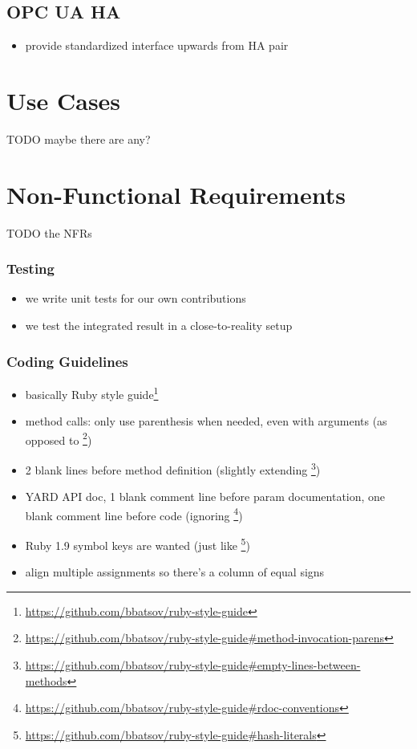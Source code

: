 \subsection{OPC UA HA}
\begin{itemize}
	\item provide standardized interface upwards from HA pair
\end{itemize}

\section{Use Cases}
TODO maybe there are any?

\section{Non-Functional Requirements}
TODO the NFRs

\subsubsection{Testing}
\begin{itemize}
	\item we write unit tests for our own contributions
	\item we test the integrated result in a close-to-reality setup
\end{itemize}


\subsubsection{Coding Guidelines}
\begin{itemize}
	\item basically Ruby style guide\footnote{\url{https://github.com/bbatsov/ruby-style-guide}}
	\item method calls: only use parenthesis when needed, even with arguments (as opposed to \footnote{\url{https://github.com/bbatsov/ruby-style-guide\#method-invocation-parens}})
	\item 2 blank lines before method definition (slightly extending \footnote{\url{https://github.com/bbatsov/ruby-style-guide\#empty-lines-between-methods}})
	\item YARD API doc, 1 blank comment line before param documentation, one blank comment line before code (ignoring \footnote{\url{https://github.com/bbatsov/ruby-style-guide\#rdoc-conventions}})
	\item Ruby 1.9 symbol keys are wanted (just like \footnote{\url{https://github.com/bbatsov/ruby-style-guide\#hash-literals}})
	\item align multiple assignments so there's a column of equal signs
\end{itemize}
